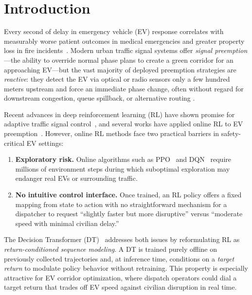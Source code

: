 \documentclass[journal]{IEEEtran}
\begin{document}
\section{Introduction}
\label{sec:introduction}

Every second of delay in emergency vehicle (EV) response correlates
with measurably worse patient outcomes in medical emergencies and
greater property loss in fire incidents~\cite{qin2012control}.
Modern urban traffic signal systems offer \emph{signal preemption}
---the ability to override normal phase plans to create a green
corridor for an approaching EV---but the vast majority of deployed
preemption strategies are \emph{reactive}: they detect the EV via
optical or radio sensors only a few hundred meters upstream and force
an immediate phase change, often without regard for downstream
congestion, queue spillback, or alternative routing
\cite{wang2022ev,haydari2020deep}.

Recent advances in deep reinforcement learning (RL) have shown promise
for adaptive traffic signal control~\cite{wei2019presslight,
wei2019colight,chen2020toward,chu2019multi}, and several works have
applied online RL to EV preemption~\cite{wang2022ev}.  However, online
RL methods face two practical barriers in safety-critical EV settings:
\begin{enumerate}
  \item \textbf{Exploratory risk.}  Online algorithms such as
    PPO~\cite{schulman2017proximal} and DQN~\cite{mnih2015human}
    require millions of environment steps during which suboptimal
    exploration may endanger real EVs or surrounding traffic.
  \item \textbf{No intuitive control interface.}  Once trained, an RL
    policy offers a fixed mapping from state to action with no
    straightforward mechanism for a dispatcher to request ``slightly
    faster but more disruptive'' versus ``moderate speed with minimal
    civilian delay.''
\end{enumerate}

The Decision Transformer (DT)~\cite{chen2021decision} addresses both
issues by reformulating RL as \emph{return-conditioned sequence
modeling}.  A DT is trained purely offline on previously collected
trajectories and, at inference time, conditions on a
\emph{target return} to modulate policy behavior without retraining.
This property is especially attractive for EV corridor optimization,
where dispatch operators could dial a target return that trades off EV
speed against civilian disruption in real time.
\end{document}
